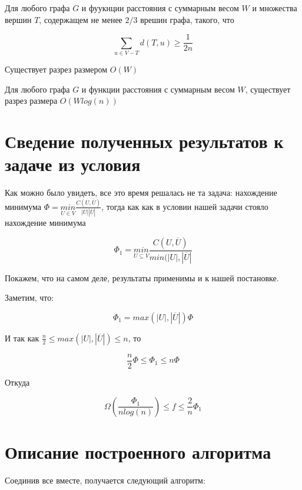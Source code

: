 \documentclass[12pt]{article} %
\begin{document}
\begin{Lemma}
    Для любого графа $G$ и фуукнции расстояния с суммарным весом $W$ и множества вершин $T$, содержащем не менее $2/3$ врешин графа, такого, что
    
    $$\underset{u \in V - T}{\sum} d(T, u) \geq \frac{1}{2n}$$
    
    Существует разрез размером $O(W)$
\end{Lemma}

\begin{Lemma}
    Для любого графа $G$ и функции расстояния с суммарным весом $W$, существует разрез размера $O(W log(n))$
\end{Lemma}

\newpage

\section{Сведение полученных результатов к задаче из условия}

Как можно было увидеть, все это время решалась не та задача: нахождение минимума $\Phi = \underset{U \in V}{min} \frac{C(U, \overline{U})}{|U| |\overline{U}|}$, тогда как как в условии нашей задачи стояло нахождение минимума

$$\Phi_1 = \underset{U \subseteq V}{min} \frac{C(U, \overline{U})}{min(|U|, |\overline{U}|}$$

Покажем, что на самом деле, результаты применимы и к нашей постановке.

Заметим, что:

$$\Phi_1 = max(|U|, |\overline{U}|) \Phi$$

И так как $\frac{n}{2} \leq max(|U|, |\overline{U}|) \leq n$, то

$$\frac{n}{2} \Phi \leq \Phi_1 \leq n \Phi$$

Откуда 

$$\Omega(\frac{\Phi_1}{n log(n)}) \leq f \leq \frac{2}{n} \Phi_1$$

\section{Описание построенного алгоритма}

Соединив все вместе, получается следующий алгоритм:
\end{document}
